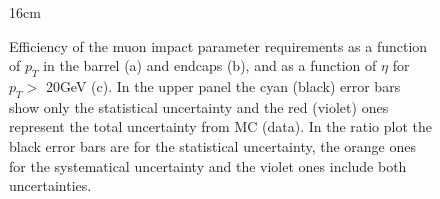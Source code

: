 \begin{figure}[hbtp]{16cm}
	\caption{Efficiency of the muon impact parameter requirements as a function of $p_{T}$ in the barrel (a) and endcaps (b), and as a function of $\eta$ for $p_{T}>$ 20GeV (c). In the upper panel the cyan (black) error bars show only the statistical uncertainty and the red (violet) ones represent the total uncertainty from MC (data). In the ratio plot the black error bars are for the statistical uncertainty, the orange ones for the systematical uncertainty and the violet ones include both uncertainties.}
	\centering
	\quad

\end{figure}

